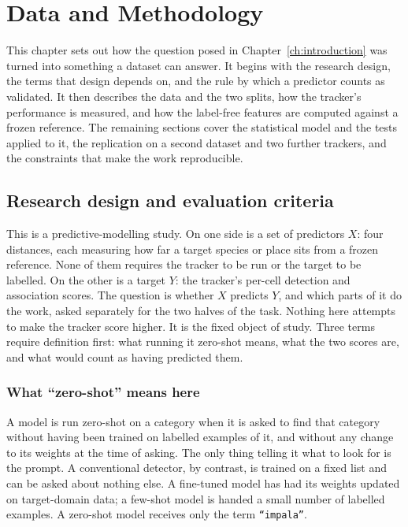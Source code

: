 \chapter{Data and Methodology}
\label{ch:methodology}

This chapter sets out how the question posed in Chapter~\ref{ch:introduction} was turned into something a
dataset can answer. It begins with the research design, the terms that design depends on, and the rule by
which a predictor counts as validated. It then describes the data and the two splits, how the tracker's
performance is measured, and how the label-free features are computed against a frozen reference. The
remaining sections cover the statistical model and the tests applied to it, the replication on a second
dataset and two further trackers, and the constraints that make the work reproducible.

\section{Research design and evaluation criteria}
\label{sec:meth-design}
This is a predictive-modelling study. On one side is a set of predictors $X$: four distances,
each measuring how far a target species or place sits from a frozen reference. None of them requires the
tracker to be run or the target to be labelled. On the other is a target $Y$: the tracker's per-cell detection
and association scores. The question is whether $X$ predicts $Y$, and which parts of it do the work, asked
separately for the two halves of the task. Nothing here attempts to make the tracker score higher. It is the
fixed object of study. Three terms require definition first: what running it zero-shot means, what the two
scores are, and what would count as having predicted them.

\subsection{What ``zero-shot'' means here}
\label{sec:meth-zeroshot}
A model is run zero-shot on a category when it is asked to find that category without having been trained on
labelled examples of it, and without any change to its weights at the time of asking. The only thing telling it
what to look for is the prompt. A conventional detector, by contrast, is trained on a fixed list and can be
asked about nothing else. A fine-tuned model has had its weights updated on target-domain data; a few-shot
model is handed a small number of labelled examples. A zero-shot model receives only the term
\texttt{``impala''}.

